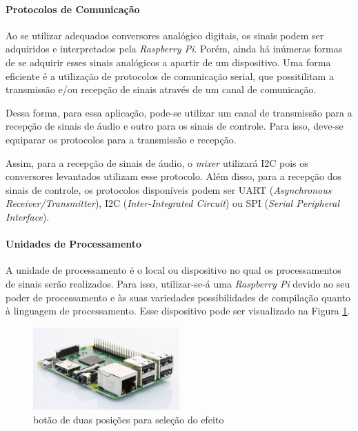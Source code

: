     \paragraph{Protocolos de Comunicação}
    Ao se utilizar adequados conversores analógico digitais, os sinais podem ser adquiridos e interpretados pela \textit{Raspberry Pi}. Porém, ainda há inúmeras formas de se adquirir esses sinais analógicos a apartir de um dispositivo. Uma forma eficiente é a utilização de protocolos de comunicação serial, que possitilitam a transmissão e/ou recepção de sinais através de um canal de comunicação.

    Dessa forma, para essa aplicação, pode-se utilizar um canal de transmissão para a recepção de sinais de áudio e outro para os sinais de controle. Para isso, deve-se equiparar os protocolos para a transmissão e recepção.

    Assim, para a recepção de sinais de áudio, o \textit{mixer} utilizará I2C pois os conversores levantados utilizam esse protocolo. Além disso, para a recepção dos sinais de controle, os protocolos disponíveis podem ser UART (\textit{Asynchronous Receiver/Transmitter}), I2C (\textit{Inter-Integrated Circuit}) ou SPI (\textit{Serial Peripheral Interface}).


    \paragraph{Unidades de Processamento}

    A unidade de processamento é o local ou dispositivo no qual os processamentos de sinais serão realizados. Para isso, utilizar-se-á uma \textit{Raspberry Pi} devido ao seu poder de processamento e às suas variedades possibilidades de compilação quanto à linguagem de processamento. Esse dispositivo pode ser visualizado na Figura \ref{fig65}.

    \begin{figure}[h]
        \centering
        \includegraphics[width=0.5\textwidth]{figuras/fig65.jpg}
        \caption{botão de duas posições para seleção do efeito}
        \label{fig65}
    \end{figure}    


